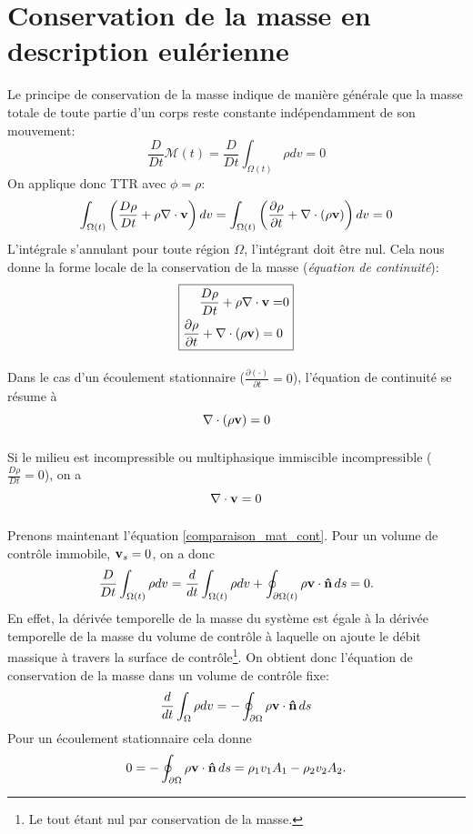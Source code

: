 \section{Conservation de la masse en description eulérienne}
Le principe de conservation de la masse indique de manière générale que la masse totale de toute partie d'un corps reste constante indépendamment de son mouvement: $$\frac{D}{Dt}\mathcal{M}(t)=\frac{D}{Dt}\int_{\Omega (t)}\rho dv=0$$
On applique donc TTR avec $\phi=\rho$:
$$\int_{\Omega (t)}\left(\frac{D\rho}{Dt}+\rho\nabla\cdot\textbf{v}\right)dv=\int_{\Omega (t)}\left(\frac{\partial \rho}{\partial t}+\nabla\cdot(\rho\textbf{v})\right)dv=0$$
L'intégrale s'annulant pour toute région $\Omega$, l'intégrant doit être nul. Cela nous donne la forme locale de la conservation de la masse (\emph{équation de continuité}):
$$\boxed{
\begin{aligned}
\frac{D\rho}{Dt}+\rho\nabla\cdot\textbf{v}=&0 \\
\frac{\partial \rho}{\partial t}+\nabla\cdot(\rho\textbf{v})=0\\
\end{aligned}
}$$
\paragraph{}
Dans le cas d'un écoulement stationnaire ($\frac{\partial(\cdot)}{\partial t}=0$), l'équation de continuité se résume à $$\nabla\cdot(\rho\textbf{v})=0$$
\paragraph{}
Si le milieu est incompressible ou multiphasique immiscible incompressible ($\frac{D\rho}{Dt}=0$), on a $$\nabla\cdot\textbf{v}=0$$
\paragraph{}
Prenons maintenant l'équation \ref{comparaison_mat_cont}. Pour un volume de contrôle immobile, $\textbf{v}_s=0$, on a donc $$\frac{D}{Dt}\int_{\Omega (t)}\rho dv=\frac{d}{dt}\int_{\Omega (t)}\rho dv+\oint_{\partial\Omega (t)}\rho\textbf{v}\cdot\textbf{\^n}\,ds=0.$$ En effet, la dérivée temporelle de la masse du système est égale à la dérivée temporelle de la masse du volume de contrôle à laquelle on ajoute le débit massique à travers la  surface de contrôle\footnote{Le tout étant nul par conservation de la masse.}. On obtient donc l'équation de conservation de la masse dans un volume de contrôle fixe:
$$\frac{d}{dt}\int_{\Omega }\rho dv=-\oint_{\partial\Omega }\rho\textbf{v}\cdot\textbf{\^n}\,ds$$
Pour un écoulement stationnaire cela donne
$$0=-\oint_{\partial\Omega }\rho\textbf{v}\cdot\textbf{\^n}\,ds=\rho_1v_1A_1-\rho_2v_2A_2.$$
